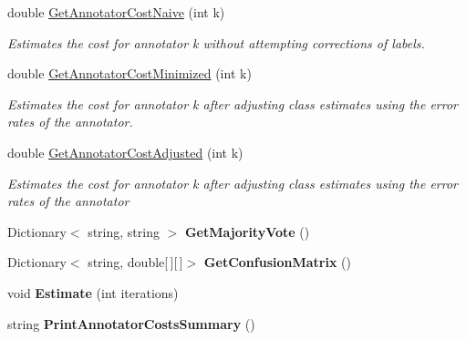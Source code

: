 \begin{DoxyCompactItemize}
\item 
double \hyperlink{class_get_another_label_1_1_dawid_skene_a8964fe474a669958bf68d0a8d42c4628}{Get\+Annotator\+Cost\+Naive} (int k)
\begin{DoxyCompactList}\small\item\em Estimates the cost for annotator k without attempting corrections of labels. \end{DoxyCompactList}\item 
double \hyperlink{class_get_another_label_1_1_dawid_skene_abd35ab6861753656bb1eb009f2c53b96}{Get\+Annotator\+Cost\+Minimized} (int k)
\begin{DoxyCompactList}\small\item\em Estimates the cost for annotator k after adjusting class estimates using the error rates of the annotator. \end{DoxyCompactList}\item 
double \hyperlink{class_get_another_label_1_1_dawid_skene_afda5d90190e29bea2f5f92112d8b712b}{Get\+Annotator\+Cost\+Adjusted} (int k)
\begin{DoxyCompactList}\small\item\em Estimates the cost for annotator k after adjusting class estimates using the error rates of the annotator \end{DoxyCompactList}\item 
\hypertarget{class_get_another_label_1_1_dawid_skene_ad561faec231559f32ddd2fa4657356e4}{}Dictionary$<$ string, string $>$ {\bfseries Get\+Majority\+Vote} ()\label{class_get_another_label_1_1_dawid_skene_ad561faec231559f32ddd2fa4657356e4}

\item 
\hypertarget{class_get_another_label_1_1_dawid_skene_a6292bfe3348e5eb5262f5082e1514dbe}{}Dictionary$<$ string, double\mbox{[}$\,$\mbox{]}\mbox{[}$\,$\mbox{]}$>$ {\bfseries Get\+Confusion\+Matrix} ()\label{class_get_another_label_1_1_dawid_skene_a6292bfe3348e5eb5262f5082e1514dbe}

\item 
\hypertarget{class_get_another_label_1_1_dawid_skene_a535c7809ddbb6271888a8ef9d320e7b1}{}void {\bfseries Estimate} (int iterations)\label{class_get_another_label_1_1_dawid_skene_a535c7809ddbb6271888a8ef9d320e7b1}

\item 
\hypertarget{class_get_another_label_1_1_dawid_skene_ab2d113fd5a414d3188dcf63b60d898d9}{}string {\bfseries Print\+Annotator\+Costs\+Summary} ()\label{class_get_another_label_1_1_dawid_skene_ab2d113fd5a414d3188dcf63b60d898d9}


\end{DoxyCompactItemize}
